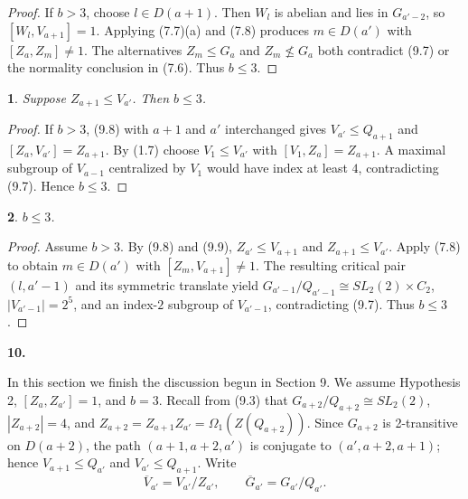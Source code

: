 \documentclass[11pt]{article}
\theoremstyle{plain}
\theoremstyle{stmplain}
\newtheorem{stm}{}[section]
\newcommand{\sect}[1]{\stepcounter{section}\par\vspace{14pt}%
  \begin{center}\textbf{#1.}\end{center}\vspace{2pt}}
\begin{document}
\begin{proof}
If $b>3$, choose $l\in D(a+1)$. Then $W_l$ is abelian and lies in
$G_{a'-2}$, so $[W_l,V_{a+1}]=1$. Applying (7.7)(a) and (7.8)
produces $m\in D(a')$ with $[Z_a,Z_m]\ne1$. The alternatives
$Z_m\le G_a$ and $Z_m\nleq G_a$ both contradict (9.7) or the
normality conclusion in (7.6). Thus $b\le3$.
\end{proof}

\begin{stm}\label{st:9.9}
Suppose $Z_{a+1}\le V_{a'}$. Then $b\le3$.
\end{stm}

\begin{proof}
If $b>3$, (9.8) with $a+1$ and $a'$ interchanged gives
$V_{a'}\le Q_{a+1}$ and $[Z_a,V_{a'}]=Z_{a+1}$. By (1.7) choose
$V_1\le V_{a'}$ with
$[V_1,Z_a]=Z_{a+1}$. A maximal subgroup of $V_{a-1}$ centralized by
$V_1$ would have index at least $4$, contradicting (9.7). Hence
$b\le3$.
\end{proof}

\begin{stm}\label{st:9.10}
$b\le3$.
\end{stm}

\begin{proof}
Assume $b>3$. By (9.8) and (9.9),
$Z_{a'}\le V_{a+1}$ and $Z_{a+1}\le V_{a'}$. Apply (7.8) to obtain
$m\in D(a')$ with $[Z_m,V_{a+1}]\ne1$. The resulting critical pair
$(l,a'-1)$ and its symmetric translate yield
$G_{a'-1}/Q_{a'-1}\cong SL_2(2)\times C_2$,
$|V_{a'-1}|=2^5$, and an index-$2$ subgroup of $V_{a'-1}$,
contradicting (9.7). Thus $b\le3$.
\end{proof}

\sect{10}

\noindent In this section we finish the discussion begun in Section 9. We
assume Hypothesis 2, $[Z_a,Z_{a'}]=1$, and $b=3$. Recall from (9.3) that
$G_{a+2}/Q_{a+2}\cong SL_2(2)$, $|Z_{a+2}|=4$, and
$Z_{a+2}=Z_{a+1}Z_{a'}=\Omega_1(Z(Q_{a+2}))$. Since $G_{a+2}$ is
2-transitive on $D(a+2)$, the path $(a+1,a+2,a')$ is conjugate to
$(a',a+2,a+1)$; hence $V_{a+1}\le Q_{a'}$ and $V_{a'}\le Q_{a+1}$.
Write
\[
 \overline V_{a'}=V_{a'}/Z_{a'},\qquad
 \overline G_{a'}=G_{a'}/Q_{a'}.
\]
\end{document}
